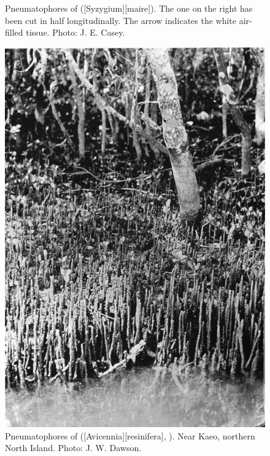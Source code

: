 \begin{figure}[t]
\begin{minipage}[t]{\textwidth}
\begin{minipage}[t]{(\textwidth-\fgap-\fgap) * \real{0.280}}
			\caption[Pneumatophores of swamp maire]{Pneumatophores of  ([Syzygium][maire]).
			The one on the right has been cut in half longitudinally.
			The arrow indicates the white air-filled tissue.
			Photo:  J. E. Casey.}%
			\label{fig:12swampmaire}
		\end{minipage}\hspace{\fgap}%
		\begin{minipage}[t]{(\textwidth-\fgap-\fgap) * \real{0.366}}
			\centering
			\includegraphics[width=\textwidth]{graphics/figure13mangrove.jpg}
			\caption[Pneumatophores of mangrove]{Pneumatophores of  ([Avicennia][resinifera], ).
			Near Kaeo, northern North Island.
			Photo:  J. W. Dawson.}%
			\label{fig:13mangrove}
		\end{minipage}\hspace{\fgap}%

\end{minipage}
\end{figure}
